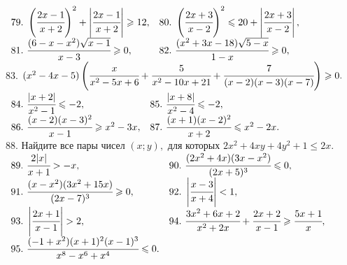 $\begin{array}{ll}
79.\ \left(\cfrac{2x-1}{x+2}\right)^2+\left|\cfrac{2x-1}{x+2}\right|\geqslant12,&
80.\ \left(\cfrac{2x+3}{x-2}\right)^2\leqslant20+\left|\cfrac{2x+3}{x-2}\right|,\\
81.\ \cfrac{(6-x-x^2)\sqrt{x-1}}{x-3}\geqslant0,&
82.\ \cfrac{(x^2+3x-18)\sqrt{5-x}}{1-x}\geqslant0,
\end{array}$\\
83. $(x^2-4x-5)\left(\cfrac{x}{x^2-5x+6}+\cfrac{5}{x^2-10x+21}+\cfrac{7}{(x-2)(x-3)(x-7)}\right)\geqslant0.$\\
$\begin{array}{ll}
84.\ \cfrac{|x+2|}{x^2-1}\leqslant-2,&
85.\ \cfrac{|x+8|}{x^2-4}\leqslant-2,\\
86.\ \cfrac{(x-2)(x-3)^2}{x-1}\geqslant x^2-3x,&
87.\ \cfrac{(x+1)(x-2)^2}{x+2}\leqslant x^2-2x.
\end{array}$\\
88. Найдите все пары чисел $(x;y),$ для которых $2x^2+4xy+4y^2+1\leqslant 2x.$\\
$\begin{array}{ll}
89.\ \cfrac{2|x|}{x+1}>-x,&
90.\ \cfrac{(2x^2+4x)(3x-x^2)}{(2x+5)^3}\leqslant 0,\\
91.\ \cfrac{(x-x^2)(3x^2+15x)}{(2x-7)^3}\geqslant 0,&
92.\ \left|\cfrac{x-3}{x+4}\right|<1,\\
93.\ \left|\cfrac{2x+1}{x-1}\right|>2,&
94.\ \cfrac{3x^2+6x+2}{x^2+2x}+\cfrac{2x+2}{x-1}\geqslant\cfrac{5x+1}{x},\\
95.\ \cfrac{(-1+x^2)(x+1)^2(x-1)^3}{x^8-x^6+x^4}\leqslant0.
\end{array}$
\newpage
